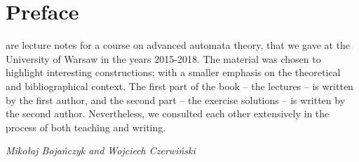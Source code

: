 \documentclass[b5paper,11pt]{book}
\begin{document}
\chapter*{Preface}%
{  \raggedright
{} are lecture notes for a course on advanced automata theory, that we gave at the University of Warsaw in the years 2015-2018.  
The material was chosen to highlight interesting constructions; with a smaller emphasis on  the theoretical and bibliographical context. The  first part of the book -- the lectures -- is written  by the first author, and the second part -- the exercise solutions -- is  written by the second author. Nevertheless,  we consulted each other extensively in the process of both teaching and writing. 

\bigskip
{\slshape  \noindent Miko{\l}aj Boja\'nczyk and Wojciech Czerwi\'nski}


\cleardoublepage
{}%
\tableofcontents
\thispagestyle{empty}

\mainmatter   %
\pagestyle{fancy}

\newcommand{\rozdzial}[2]{ 
\chapter{#1}
\seclabel{sec:#2}
\secintro{}

}

\newcommand{\bookcontent}{
\rozdzial{Determinisation of $\omega$-automata}{determinisation}
\rozdzial{Infinite duration games}{buchi-landweber}	
\rozdzial{Parity games in quasipolynomial time}{quasipol}
\rozdzial{Distance automata}{distance-automata}
\rozdzial{Monadic second-order logic}{tree-aut}
\rozdzial{Treewidth}{courcelle}
\rozdzial{Tree-walking automata}{twa}
\rozdzial{Weighted automata over a field}{linear-automata}
\rozdzial{Vector addition systems}{wqo}
\rozdzial{First-order theory of the reals}{tarski}
\rozdzial{Polynomial grammars}{hilbert}
\rozdzial{Parsing in matrix multiplication time}{valiant}
\rozdzial{Two-way transducers}{two-way}
\rozdzial{Streaming string transducers}{sst}
\rozdzial{Learning automata}{angluin}
}

\ignore{

	














	














}}
\end{document}
